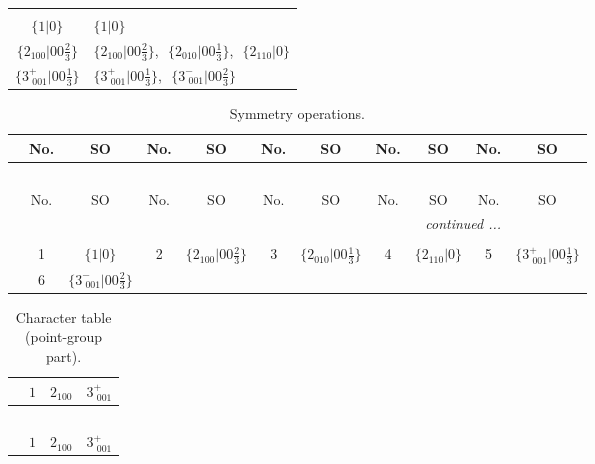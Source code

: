 \documentclass[fleqn,10pt,landscape]{article}
\begin{document}
\begin{itemize}
\begin{center}
\begin{longtable}{c|l}
 \hline \hline
\multicolumn{1}{r}{} \\ \endlastfoot

$\{1|0\}$ & $\{1|0\}$ \\ \hline
$\{2{}_{100}|0 0 \frac{2}{3}\}$ & $\{2{}_{100}|0 0 \frac{2}{3}\}$,\,\, $\{2{}_{010}|0 0 \frac{1}{3}\}$,\,\, $\{2{}_{110}|0\}$ \\ \hline
$\{3^{+}_{\,\,001}|0 0 \frac{1}{3}\}$ & $\{3^{+}_{\,\,001}|0 0 \frac{1}{3}\}$,\,\, $\{3^{-}_{\,\,001}|0 0 \frac{2}{3}\}$ \\
\end{longtable}
\end{center}
\begin{center}
\renewcommand{\arraystretch}{1.3}
\begin{longtable}{c|cc|cc|cc|cc|cc}
\caption{Symmetry operations.}
 \\
 \hline \hline
 & No. & SO & No. & SO & No. & SO & No. & SO & No. & SO \\ \hline \endfirsthead

\multicolumn{10}{l}{\tablename\ \thetable{}} \\
 \hline \hline
 & No. & SO & No. & SO & No. & SO & No. & SO & No. & SO \\ \hline \endhead

 \hline \hline
\multicolumn{10}{r}{\footnotesize\it continued ...} \\ \endfoot

 \hline \hline
\multicolumn{10}{r}{} \\ \endlastfoot

 & 1 & $\{1|0\}$ & 2 & $\{2{}_{100}|0 0 \frac{2}{3}\}$ & 3 & $\{2{}_{010}|0 0 \frac{1}{3}\}$ & 4 & $\{2{}_{110}|0\}$ & 5 & $\{3^{+}_{\,\,001}|0 0 \frac{1}{3}\}$ \\
& 6 & $\{3^{-}_{\,\,001}|0 0 \frac{2}{3}\}$ &  &  &  &  &  &  &  &  \\
\end{longtable}
\end{center}
\begin{center}
\renewcommand{\arraystretch}{1.0}
\begin{longtable}{c|rrr}
\caption{Character table (point-group part).}
 \\
 \hline \hline
 & $ 1 $ & $ 2{}_{100} $ & $ 3^{+}_{\,\,001} $ \\ \hline \endfirsthead

\multicolumn{3}{l}{\tablename\ \thetable{}} \\
 \hline \hline
 & $ 1 $ & $ 2{}_{100} $ & $ 3^{+}_{\,\,001} $ \\ \hline \endhead


\end{longtable}
\end{center}
\end{itemize}
\end{document}
